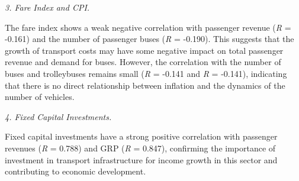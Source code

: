 \begin{multicols}{2}
\emph{3. Fare Index and CPI.}

The fare index shows a weak negative correlation with passenger revenue
(\emph{R} = -0.161) and the number of passenger buses (\emph{R} =
-0.190). This suggests that the growth of transport costs may have some
negative impact on total passenger revenue and demand for buses.
However, the correlation with the number of buses and trolleybuses
remains small (\emph{R} = -0.141 and \emph{R} = -0.141), indicating that
there is no direct relationship between inflation and the dynamics of
the number of vehicles.

\emph{4. Fixed Capital Investments.}

Fixed capital investments have a strong positive correlation with
passenger revenues (\emph{R} = 0.788) and GRP (\emph{R} = 0.847),
confirming the importance of investment in transport infrastructure for
income growth in this sector and contributing to economic development.
\end{multicols}


